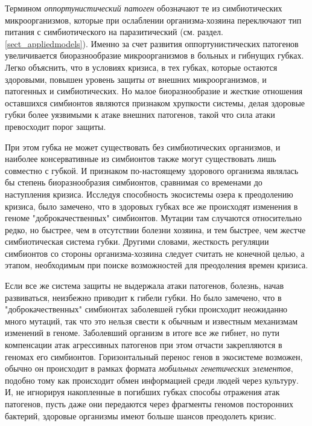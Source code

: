 Термином \textit{оппортунистический патоген} обозначают те из симбиотических микроорганизмов, которые при ослаблении организма-хозяина переключают тип питания с симбиотического на паразитический (см. раздел. \ref{sect_appliedmodels}). Именно за счет развития оппортунистических патогенов увеличивается биоразнообразие микроорганизмов в больных и гибнущих губках. Легко объяснить, что в условиях кризиса, в тех губках, которые остаются здоровыми, повышен уровень защиты от внешних микроорганизмов, и патогенных и симбиотических. Но малое биоразнообразие и жесткие отношения оставшихся симбионтов являются признаком хрупкости системы, делая здоровые губки более уязвимыми к атаке внешних патогенов, такой что сила атаки превосходит порог защиты. 

При этом губка не может существовать без симбиотических организмов, и наиболее консервативные из симбионтов также могут существовать лишь совместно с губкой. И признаком по-настоящему здорового организма являлась бы степень биоразнообразия симбионтов, сравнимая со временами до наступления кризиса. Исследуя способность экосистемы озера к преодолению кризиса, было замечено, что в здоровых губках все же происходят изменения в геноме "доброкачественных" симбионтов. Мутации там случаются относительно редко, но быстрее, чем в отсутствии болезни хозяина, и тем быстрее, чем жестче симбиотическая система губки. Другими словами, жесткость регуляции симбионтов со стороны организма-хозяина следует считать не конечной целью, а этапом, необходимым при поиске возможностей для преодоления времен кризиса.

Если все же система защиты не выдержала атаки патогенов, болезнь, начав развиваться, неизбежно приводит к гибели губки. Но было замечено, что в "доброкачественных" симбионтах заболевшей губки происходит неожиданно много мутаций, так что это нельзя свести к обычным и известным механизмам изменений в геноме. Заболевший организм в итоге все же гибнет, но пути компенсации атак агрессивных патогенов при этом отчасти закрепляются в геномах его симбионтов. Горизонтальный перенос генов в экосистеме возможен, обычно он происходит в рамках формата \textit{мобильных генетических элементов}, подобно тому как происходит обмен информацией среди людей через культуру. И, не игнорируя накопленные в погибших губках способы отражения атак патогенов, пусть даже они передаются через фрагменты геномов посторонних бактерий, здоровые организмы имеют больше шансов преодолеть кризис.


